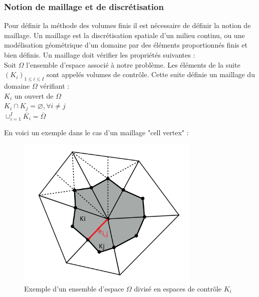 \documentclass[12pt]{article}
\begin{document}
\subsubsection{Notion de maillage et de discrétisation}

\noindent Pour définir la méthode des volumes finis il est nécessaire de définir la notion de maillage.
Un maillage est la discrétisation spatiale d'un milieu continu, ou une modélisation géométrique d'un domaine par des éléments proportionnés finis et bien définis. Un maillage doit vérifier les propriétés suivantes :
\\Soit $\Omega$ l'ensemble d'espace associé à notre problème. 
Les éléments de la suite $(K_i)_{1\leq{i}\leq{I}}$ sont appelés volumes de contrôle. Cette suite définie un maillage du domaine $\Omega$  vérifiant :
\\  $K_i$ un ouvert de $\Omega$
\\  $K_i \cap K_j = \varnothing, \forall i \neq j$
\\  $\cup_{i=1}^{I} \overline{K_i} = \overline{\Omega}$

\noindent En voici un exemple dans le cas d'un maillage "cell vertex" :

    \begin{figure}[H]
	\centering
	\includegraphics[scale=0.5]{Ki.png}
	\caption{Exemple d'un ensemble d'espace $\Omega$ divisé en espaces de contrôle $K_i$}
	\label{Ki}
	\end{figure}
\end{document}
